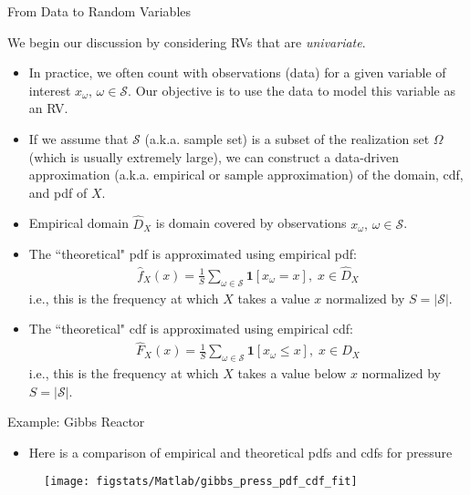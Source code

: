 \documentclass[9pt]{beamer}
\begin{document}
\begin{frame}{From Data to Random Variables}
\begin{block}{}
We begin our discussion by considering RVs that are {\em univariate}.
\end{block}
\begin{itemize}
 \setlength{\itemsep}{5pt}
\item In practice, we often count with observations (data) for a given variable of interest $x_\omega,\, \omega \in \mathcal{S}$. Our objective is to use the data to model this variable as an RV. 
\item If we assume that $\mathcal{S}$ (a.k.a. sample set) is a subset of the realization set $\Omega$ (which is usually extremely large), we can construct a data-driven approximation (a.k.a. empirical or sample approximation) of the domain, cdf, and pdf of $X$.
\item Empirical domain $\hat{D}_X$ is domain covered by observations $x_\omega,\, \omega \in \mathcal{S}$.
\item The ``theoretical" pdf is approximated using empirical pdf: 
\begin{align*}
\hat{f}_X(x)=\frac{1}{S}\sum_{\omega \in \mathcal{S}}\mathbf{1}[x_\omega= x],\; x\in \hat{D}_X
\end{align*}
i.e., this is the frequency at which $X$ takes a value $x$ normalized by $S=|\mathcal{S}|$. 
\item The ``theoretical" cdf is approximated using empirical cdf:
\begin{align*}
\hat{F}_X(x)=\frac{1}{S}\sum_{\omega \in \mathcal{S}}\mathbf{1}[x_\omega\leq x],\; x\in \hat{D}_X
\end{align*}
i.e., this is the frequency at which $X$ takes a value below $x$ normalized by $S=|\mathcal{S}|$. 
\end{itemize}
\end{frame}

\begin{frame}{Example: Gibbs Reactor}

\begin{itemize}
\item Here is a comparison of empirical and theoretical pdfs and cdfs for pressure
\end{itemize}
\begin{figure}[!htb]
    \centering
	\texttt{[image: figstats/Matlab/gibbs\_press\_pdf\_cdf\_fit]}
\end{figure}

\end{frame}
\end{document}
